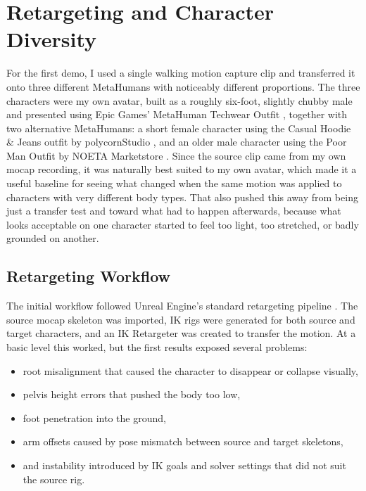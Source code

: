 \section{Retargeting and Character Diversity}

For the first demo, I used a single walking motion capture clip and transferred it onto three different MetaHumans with noticeably different proportions. The three characters were my own avatar, built as a roughly six-foot, slightly chubby male and presented using Epic Games' MetaHuman Techwear Outfit \cite{fab_avatar_outfit}, together with two alternative MetaHumans: a short female character using the Casual Hoodie \& Jeans outfit by polycornStudio \cite{fab_female_outfit}, and an older male character using the Poor Man Outfit by NOETA Marketstore \cite{fab_oldman_outfit}. Since the source clip came from my own mocap recording, it was naturally best suited to my own avatar, which made it a useful baseline for seeing what changed when the same motion was applied to characters with very different body types. That also pushed this away from being just a transfer test and toward what had to happen afterwards, because what looks acceptable on one character started to feel too light, too stretched, or badly grounded on another.

\subsection{Retargeting Workflow}

The initial workflow followed Unreal Engine's standard retargeting pipeline \cite{epic_ik_retargeter}. The source mocap skeleton was imported, IK rigs were generated for both source and target characters, and an IK Retargeter was created to transfer the motion. At a basic level this worked, but the first results exposed several problems:

\begin{itemize}[leftmargin=*]
    \item root misalignment that caused the character to disappear or collapse visually,
    \item pelvis height errors that pushed the body too low,
    \item foot penetration into the ground,
    \item arm offsets caused by pose mismatch between source and target skeletons,
    \item and instability introduced by IK goals and solver settings that did not suit the source rig.
\end{itemize}

